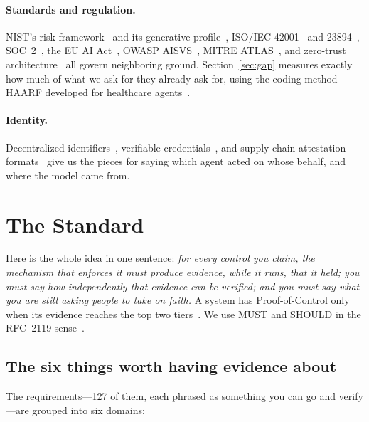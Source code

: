 \documentclass[11pt]{article}
\newcommand{\poc}{Proof-of-Control}
\begin{document}
\paragraph{Standards and regulation.} NIST's risk framework~\cite{nistairmf}
and its generative profile~\cite{nist6001}, ISO/IEC 42001~\cite{iso42001} and
23894~\cite{iso23894}, SOC~2~\cite{soc2tsc}, the EU AI Act~\cite{euaiact},
OWASP AISVS~\cite{owaspaisvs}, MITRE ATLAS~\cite{mitreatlas}, and zero-trust
architecture~\cite{sp800207} all govern neighboring ground.
Section~\ref{sec:gap} measures exactly how much of what we ask for they
already ask for, using the coding method HAARF developed for healthcare
agents~\cite{haarf2026}.

\paragraph{Identity.} Decentralized identifiers~\cite{w3cdid}, verifiable
credentials~\cite{w3cvc2}, and supply-chain attestation
formats~\cite{slsa,c2pa} give us the pieces for saying which agent acted on
whose behalf, and where the model came from.

\section{The Standard}
\label{sec:standard}

Here is the whole idea in one sentence: \emph{for every control you claim, the
mechanism that enforces it must produce evidence, while it runs, that it held;
you must say how independently that evidence can be verified; and you must say
what you are still asking people to take on faith.} A system has \poc{} only
when its evidence reaches the top two tiers~\cite{pocspec}. We use MUST and
SHOULD in the RFC~2119 sense~\cite{rfc2119}.

\subsection{The six things worth having evidence about}
The requirements---127 of them, each phrased as something you can go and
verify---are grouped into six domains:
\end{document}
